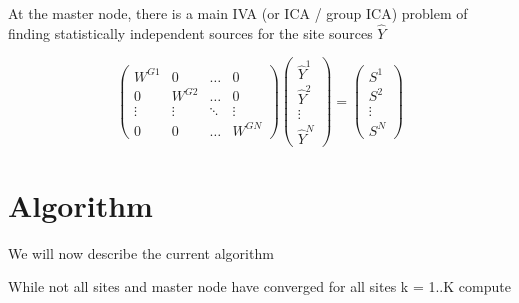 \documentclass{amsproc}
\begin{document}
At the master node, there is a main IVA (or ICA / group ICA) problem of finding statistically independent sources for the site sources $\hat{Y}$
        
\[
    \begin{pmatrix}
        W^{G1}  & 0         & \dots     & 0         \\
        0       & W^{G2}    & \dots     & 0         \\
        \vdots  & \vdots    & \ddots    & \vdots    \\
        0       & 0         & \dots     & W^{GN}
    \end{pmatrix}
    \begin{pmatrix}
        \hat{Y}^1   \\
        \hat{Y}^2   \\
        \vdots      \\
        \hat{Y}^N
    \end{pmatrix}
    =
    \begin{pmatrix}
        S^1     \\
        S^2     \\
        \vdots  \\
        S^N
    \end{pmatrix}
\]


\section{Algorithm} We will now describe the current algorithm


\begin{algorithm}
While not all sites and master node have converged 
    for all sites k = 1..K
        compute
\end{algorithm}
\end{document}
